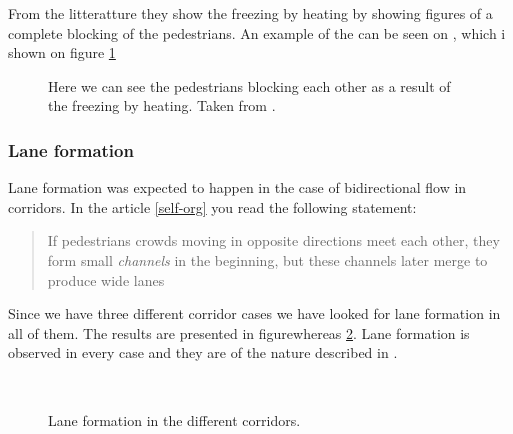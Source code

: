 From the litteratture they show the freezing by heating by showing figures of a complete blocking of the pedestrians. An example of the can be seen on \cite{oscil}, which i shown on figure \ref{fig:freezing_by_heating_litterature}

\begin{figure}[h]
\centering
{}
\caption{Here we can see the pedestrians blocking each other as a result of the freezing by heating. Taken from \cite{oscil}.}
\label{fig:freezing_by_heating_litterature}
\end{figure}


\subsubsection{Lane formation}
Lane formation was expected to happen in the case of bidirectional
flow in corridors. In the article \ref{self-org} you read the following
statement:

\begin{quote}
If pedestrians crowds moving in opposite directions meet each other,
they form small \emph{channels} in the beginning, but these channels
later merge to produce wide lanes
\end{quote}

Since we have three different corridor cases we have looked for lane
formation in all of them. The results are presented in figurewhereas
\ref{fig:laneformation}. Lane formation is observed in every case
and they are of the nature described in \cite{self-org}.\\

\begin{figure}[h]
\centering
\subfloat[]{\resizebox{8cm}{!}{}}
\subfloat[]{\resizebox{8cm}{!}{}}\\
\subfloat[]{\resizebox{8cm}{!}{}}
\caption{Lane formation in the different corridors.}
\label{fig:laneformation}
\end{figure}

